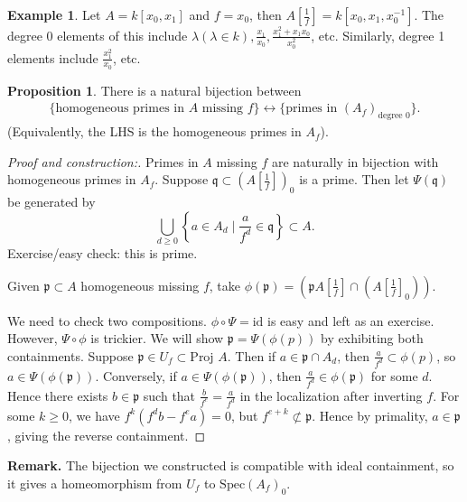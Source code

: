 \documentclass{article}
\theoremstyle{definition}
\newtheorem{prop}[theorem]{Proposition}
\newtheorem{example}{Example}[section]
\begin{document}
\begin{example}
    Let $ A = k[x_0,x_1]$ and $f = x_0$, then $A[\frac{1}{f}] = k[x_0,x_1,x_0^{-1}]$. The degree 0 elements of this include $\lambda (\lambda \in k), \frac{x_1}{x_0}, \frac{x_1^2+x_1x_0}{x_0^2}$, etc. Similarly, degree 1 elements include $\frac{x_1^2}{x_0}$, etc.  
\end{example}
\begin{prop}
    There is a natural bijection between
    \begin{align*}
        \{\text{homogeneous primes in }A \text{ missing }f\} \leftrightarrow \{\text{primes in }(A_f)_{\text{degree 0}}\}.
    \end{align*}
    (Equivalently, the LHS is the homogeneous primes in $A_f$).
\end{prop}
\begin{proof}[Proof and construction:]
    Primes in $A$ missing $f$ are naturally in bijection with homogeneous primes in $A_f$. Suppose $\mathfrak{q} \subset (A[\frac{1}{f}])_0$ is a prime. Then let $\Psi(\mathfrak{q})$ be generated by \[
    \bigcup_{d\ge 0} \left\{a \in A_d \mid \frac{a}{f^d} \in \mathfrak{q}\right\} \subset A.
    \]
    Exercise/easy check: this is prime.
    \vspace{1mm}
     
    Given $\mathfrak{p} \subset A$ homogeneous missing $f$, take $\phi(\mathfrak{p}) = \left(\mathfrak{p} A[\frac{1}{f}] \cap(A[\frac{1}{f}]_0)\right)$.
    \vspace{1mm}
     
    We need to check two compositions. $\phi \circ \Psi =\text{id}$ is easy and left as an exercise. However, $\Psi \circ \phi$ is trickier. We will show $\mathfrak{p} = \Psi(\phi(p))$ by exhibiting both containments. Suppose $\mathfrak{p} \in U_f \subset \text{Proj }A$. Then if $a \in \mathfrak{p} \cap A_d$, then $\frac{a}{f^d} \subset \phi(p)$, so $a \in \Psi(\phi(\mathfrak{p}))$. Conversely, if $a \in \Psi(\phi(\mathfrak{p}))$, then $\frac{a}{f^d} \in \phi(\mathfrak{p})$ for some $d$. Hence there exists $b \in \mathfrak{p}$ such that $\frac{b}{f^e} = \frac{a}{f^d}$ in the localization after inverting $f$. For some $k\ge 0$, we have $f^k(f^d b - f^e a) = 0$, but $f^{e+k} \not\subset \mathfrak{p}$. Hence by primality, $a \in \mathfrak{p}$, giving the reverse containment.
\end{proof}
\textbf{Remark.} The bijection we constructed is compatible with ideal containment, so it gives a homeomorphism from $U_f$ to $\text{Spec}(A_f)_0$.
\vspace{1mm}
 
\end{document}
